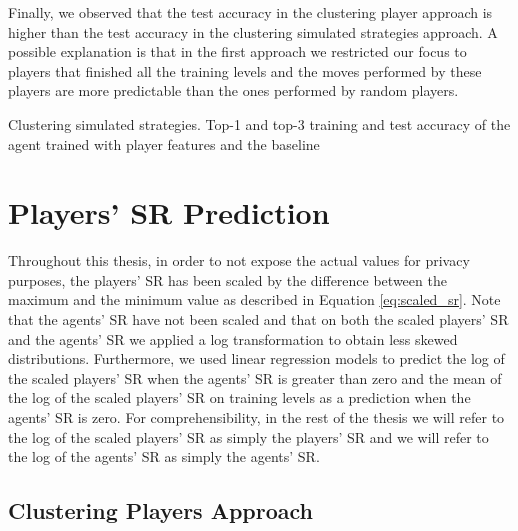 Finally, we observed that the test accuracy in the clustering player approach is higher than the test accuracy in the clustering simulated strategies approach. A possible explanation is that in the first approach we restricted our focus to players that finished all the training levels and the moves performed by these players are more predictable than the ones performed by random players.  
\begin{table}[h]
    \centering
    \small
    \caption{Clustering simulated strategies. Top-1 and top-3 training and test accuracy of the agent trained with player features and the baseline} 
    
    \label{tab:top1_top3_training_test_accuracy}
\end{table} 



\section{Players' SR Prediction}
Throughout this thesis, in order to not expose the actual values for privacy purposes, the players’ SR has been scaled by the difference between the maximum and the minimum value as described in Equation \ref{eq:scaled_sr}.
Note that the agents' SR have not been scaled and that on both the scaled players' SR and the agents' SR we applied a log transformation to obtain less skewed distributions.
Furthermore, we used linear regression models to predict the log of the scaled players' SR when the agents' SR is greater than zero and the mean of the log of the scaled players' SR on training levels as a prediction when the agents' SR is zero. For comprehensibility, in the rest of the thesis we will refer to the log of the scaled players' SR as simply the players' SR and we will refer to the log of the agents' SR as simply the agents' SR. 

\subsection{Clustering Players Approach}

